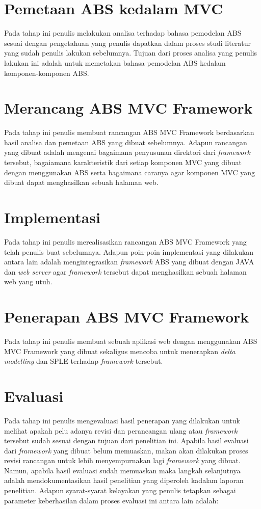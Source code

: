 \section{Pemetaan ABS kedalam MVC}

Pada tahap ini penulis melakukan analisa terhadap bahasa pemodelan ABS sesuai dengan pengetahuan yang penulis dapatkan dalam proses studi literatur yang sudah penulis lakukan sebelumnya. Tujuan dari proses analisa yang penulis lakukan ini adalah untuk memetakan bahasa pemodelan ABS kedalam komponen-komponen ABS.

\section{Merancang ABS MVC Framework}

Pada tahap ini penulis membuat rancangan ABS MVC Framework berdasarkan hasil analisa dan pemetaan ABS yang dibuat sebelumnya. Adapun rancangan yang dibuat adalah mengenai bagaimana penyusunan direktori dari \textit{framework} tersebut, bagaiamana karakteristik dari setiap komponen MVC yang dibuat dengan menggunakan ABS serta bagaimana caranya agar komponen MVC yang dibuat dapat menghasilkan sebuah halaman web.

\section{Implementasi}

Pada tahap ini penulis merealisasikan rancangan ABS MVC Framework yang telah penulis buat sebelumnya. Adapun poin-poin implementasi yang dilakukan antara lain adalah mengintegrasikan \textit{framework} ABS yang dibuat dengan JAVA dan \textit{web server} agar \textit{framework} tersebut dapat menghasilkan sebuah halaman web yang utuh.

\section{Penerapan ABS MVC Framework}

Pada tahap ini penulis membuat sebuah aplikasi web dengan menggunakan ABS MVC Framework yang dibuat sekaligus mencoba untuk menerapkan \textit{delta modelling} dan SPLE terhadap \textit{framework} tersebut.

\section{Evaluasi}

Pada tahap ini penulis mengevaluasi hasil penerapan yang dilakukan untuk melihat apakah pelu adanya revisi dan perancangan ulang atau \textit{framework} tersebut sudah sesuai dengan tujuan dari penelitian ini. Apabila hasil evaluasi dari \textit{framework} yang dibuat belum memuaskan, makan akan dilakukan proses revisi rancangan untuk lebih menyempurnakan lagi \textit{framework} yang dibuat. Namun, apabila hasil evaluasi sudah memuaskan maka langkah selanjutnya adalah mendokumentasikan hasil penelitian yang diperoleh kadalam laporan penelitian. Adapun syarat-syarat kelayakan yang penulis tetapkan sebagai parameter keberhasilan dalam proses evaluasi ini antara lain adalah:

